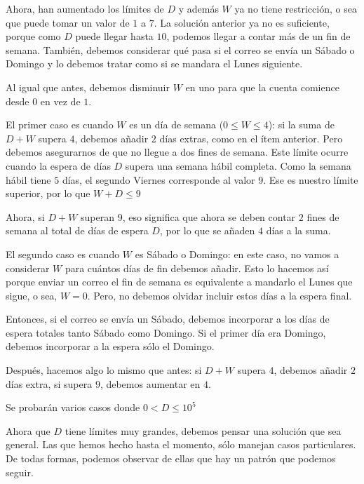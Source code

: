 \documentclass{oci}
\begin{document}
\begin{scoreDescription}
  Ahora, han aumentado los l\'imites de $D$ y adem\'as $W$ ya no tiene restricci\'on,
  o sea que puede tomar un valor de $1$ a $7$. La soluci\'on anterior ya no es suficiente,
  porque como $D$ puede llegar hasta $10$, podemos llegar a contar m\'as de un fin de 
  semana. Tambi\'en, debemos considerar qu\'e pasa si el correo se env\'ia un S\'abado
  o Domingo y lo debemos tratar como si se mandara el Lunes siguiente. 

  Al igual que antes, debemos disminuir $W$ en uno para que la cuenta comience desde $0$
  en vez de $1$.

  El primer caso es cuando $W$ es un d\'ia de semana ($0 \leq W \leq 4$): si la suma de
  $D + W$ supera $4$, debemos a\~nadir $2$ d\'ias extras, como en el 
  \'item anterior. Pero debemos asegurarnos de que no llegue a dos fines de semana.
  Este l\'imite ocurre cuando la espera de d\'ias $D$ supera una semana h\'abil completa.
  Como la semana h\'abil tiene $5$ d\'ias, el segundo Viernes corresponde al valor $9$.
  Ese es nuestro l\'imite superior, por lo que $W + D \leq 9$
  
  Ahora, si $D + W$ superan $9$, eso significa que ahora se deben contar $2$
  fines de semana al total de d\'ias de espera $D$, por lo que se a\~naden $4$ d\'ias a
  la suma.
  
  El segundo caso es cuando $W$ es S\'abado o Domingo: en este caso, no vamos a considerar
  $W$ para cu\'antos d\'ias de fin debemos a\~nadir. Esto lo hacemos as\'i porque enviar 
  un correo el fin de semana es equivalente a mandarlo el Lunes que sigue, o sea, $W = 0$.
  Pero, no debemos olvidar incluir estos d\'ias a la espera final.
  
  Entonces, si el correo se env\'ia un S\'abado, debemos incorporar a los d\'ias de espera totales
  tanto S\'abado como Domingo. Si el primer d\'ia era Domingo, debemos incorporar a la espera 
  s\'olo el Domingo.
  
  Despu\'es, hacemos algo lo mismo que antes: si $D + W$ supera $4$, debemos a\~nadir
  $2$ d\'ias extra, si supera $9$, debemos aumentar en $4$.

  \vspace{10mm}
   Se probarán varios casos donde $0 < D \leq 10^5$

  Ahora que $D$ tiene l\'imites muy grandes, debemos pensar una soluci\'on que sea 
  general. Las que hemos hecho hasta el momento, s\'olo manejan casos particulares.
  De todas formas, podemos observar de ellas que hay un patr\'on que podemos seguir.


\end{scoreDescription}
\end{document}
